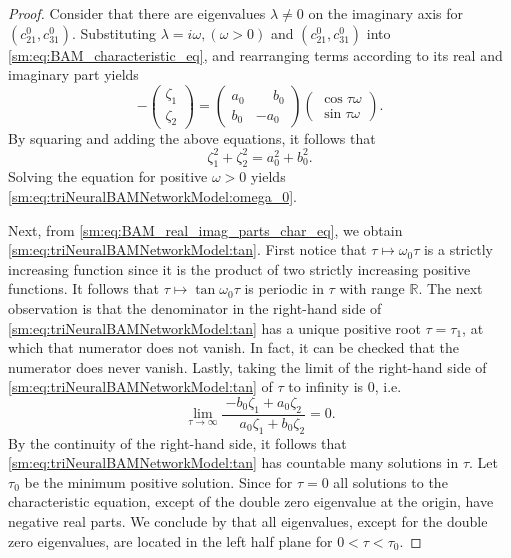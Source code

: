 \begin{proof}
Consider that there are eigenvalues $\lambda\neq0$ on the imaginary
axis for $(c_{21}^{0},c_{31}^{0})$. Substituting $\lambda=i\omega,(\omega>0)$
and $(c_{21}^{0},c_{31}^{0})$ into \cref{sm:eq:BAM_characteristic_eq},
and rearranging terms according to its real and imaginary part yields
\begin{equation}
\label{sm:eq:BAM_real_imag_parts_char_eq}
-\begin{pmatrix}
    \zeta_1 \\
    \zeta_2 
\end{pmatrix}
=
\begin{pmatrix}
    a_0 & \phantom{-}b_0 \\
    b_0 & -a_0
\end{pmatrix}
\begin{pmatrix}
\cos\tau\omega \\
\sin\tau\omega
\end{pmatrix}.
\end{equation}
By squaring and adding the above equations, it follows that
\begin{equation}
    \label{sm:eq:BAM_omega}
    \zeta_1^2 + \zeta_2^2 = a_0^2 + b_0^2.
\end{equation}
Solving the equation for positive $\omega>0$ yields \cref{sm:eq:triNeuralBAMNetworkModel:omega_0}.

Next, from \cref{sm:eq:BAM_real_imag_parts_char_eq}, we obtain \cref{sm:eq:triNeuralBAMNetworkModel:tan}.
First notice that $\tau \mapsto \omega_0 \tau$ is a strictly increasing
function since it is the product of two strictly increasing positive functions.
It follows that $\tau \mapsto \tan \omega_0 \tau$ is periodic in $\tau$ with
range $\mathbb R$. The next observation is that the denominator in the right-hand
side of \cref{sm:eq:triNeuralBAMNetworkModel:tan} has a unique positive root $\tau=\tau_1$, at which
that numerator does not vanish. In fact, it can be checked that the numerator
does never vanish. Lastly, taking the limit of the right-hand side of
\cref{sm:eq:triNeuralBAMNetworkModel:tan} of $\tau$ to infinity is $0$, i.e.
\[
    \lim_{\tau \rightarrow \infty} \frac{-b_0\zeta_1 + a_0\zeta_2}{\phantom{-}a_0\zeta_1 + b_0\zeta_2} = 0.
\]
By the continuity of the right-hand side, it follows that \cref{sm:eq:triNeuralBAMNetworkModel:tan} has
countable many solutions in $\tau$. Let $\tau_0$ be the minimum positive 
solution. Since for $\tau=0$ all solutions to the characteristic equation, except
of the double zero eigenvalue at the origin, have negative real parts.
We conclude by \cite[Corollary 2.3]{Ruan@2001} that
all eigenvalues, except for the double zero eigenvalues, are located
in the left half plane for $0 < \tau < \tau_0$.
\end{proof}


